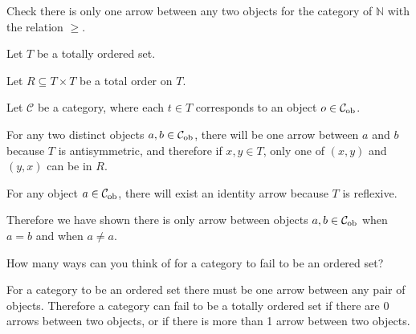 \begin{ttta}
	Check there is only one arrow between any two objects for the category of $\mathbb{N}$ with the relation $\geq$.
\end{ttta}
\begin{proofitem}
	\item Let $T$ be a totally ordered set.
	\item Let $R\subseteq T\times T$ be a total order on $T$.
	\item Let $\mathcal{C}$ be a category, where each $t\in T$ corresponds to an
	object $o\in\mathcal{C}_{\text{ob}}$.
	\item For any two distinct objects $a, b\in\mathcal{C}_{\text{ob}}{}$, there will be one arrow
	between $a$ and $b$ because $T$ is antisymmetric, and therefore if $x, y \in
		T$, only one of $(x, y)$ and $(y, x)$ can be in $R$.
	\item For any object $a\in\mathcal{C}_{\text{ob}}{}$, there will exist an identity arrow because
	$T$ is reflexive.
	\item Therefore we have shown there is only arrow between objects $a, b\in
		\mathcal{C}_{\text{ob}}{}$ when $a=b$ and when $a\neq a$.
\end{proofitem}

\begin{ttta}
	How many ways can you think of for a category to fail to be an
	ordered set?
\end{ttta}
\begin{proofitem}
	\item For a category to be an ordered set there must be one arrow between any
	pair of objects. Therefore a category can fail to be a totally ordered set
	if there are 0 arrows between two objects, or if there is more than 1 arrow
	between two objects.
\end{proofitem}

